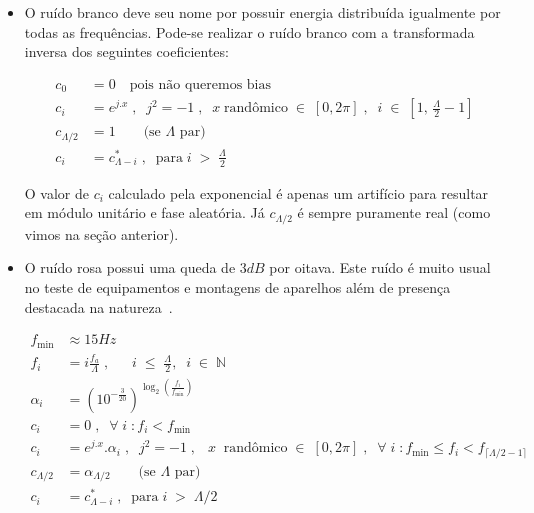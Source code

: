 \begin{itemize}

\item O ruído branco deve seu nome por possuir energia distribuída
igualmente por todas as frequências. Pode-se realizar
o ruído branco com a transformada inversa dos seguintes coeficientes:


\begin{equation}\label{eq:branco}
\begin{split}
c_0 & =0 \quad \text{pois não queremos bias} \\
c_i & =e^{j.x}\;,\;\; j^2=-1 \;, \;\; x \; \text{randômico} \; \in \; [0,2\pi]\;,\;\; i \; \in \; \left[1, \, \frac{\Lambda}{2}-1\right] \\
c_{\Lambda/2} & = 1 \quad\quad \text{(se $\Lambda$ par)}\\ 
c_i & = c_{\Lambda - i}^*\;,\;\; \text{para}\;  i \; > \;  \frac{\Lambda}{2}
\end{split}
\end{equation}

O valor de $c_i$ calculado pela exponencial é apenas um artifício para resultar em módulo unitário e fase aleatória.
Já $c_{\Lambda/2}$ é sempre puramente real (como vimos na seção anterior).

\item O ruído rosa possui uma queda de $3dB$ por oitava. Este ruído é muito usual no teste de equipamentos e montagens de aparelhos além de presença destacada na natureza~\cite{Roederer}. 

\begin{equation}\label{eq:rosa}
\begin{split}
f_{\text{min}} & \approx 15 Hz \\
f_i & = i \frac{f_a}{\Lambda} \;, \;\; \quad i \;\leq\; \frac{\Lambda}{2},\;\; i\;\in\;\mathbb{N}  \\
\alpha_i & = \left(10^{-\frac{3}{20}}\right)^{\log _2 \left ( \frac{f_i}{f_{\text{min}}} \right )}  \\
c_i & =0\;,\;\; \forall \; i \; : f_i<f_{\text{min}} \\
c_i & =e^{j.x} . \alpha_i\;,\;\; j^2=-1 \;, \;\;\  x \;\; \text{randômico} \; \in \; [0,2\pi]\;,\;\; \forall \; i \; : f_{\text{min}} \le f_i < f_{\lceil \Lambda/2-1 \rceil}  \\
c_{\Lambda/2} & = \alpha_{\Lambda/2} \quad\quad \text{(se $\Lambda$ par)}\\ 
c_i & = c_{\Lambda - i}^*\;,\;\; \text{para}\;  i \; > \;  \Lambda/2
\end{split}
\end{equation}


\end{itemize}
